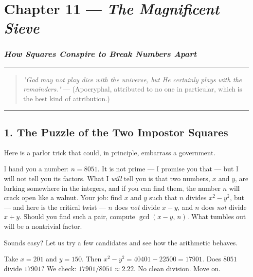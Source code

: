 \documentclass[12pt, letterpaper, openany]{book}
\theoremstyle{definition}
\theoremstyle{remark}
\begin{document}
\clearpage

\chapter{Chapter 11 --- \textit{The Magnificent Sieve}}



\subsection*{\textit{How Squares Conspire to Break Numbers Apart}}



\bigskip\noindent\rule{\textwidth}{0.4pt}\bigskip



\begin{quote}
\textit{"God may not play dice with the universe, but He certainly plays with the remainders."}
--- (Apocryphal, attributed to no one in particular, which is the best kind of attribution.)
\end{quote}



\bigskip\noindent\rule{\textwidth}{0.4pt}\bigskip



\section*{1. The Puzzle of the Two Impostor Squares}


Here is a parlor trick that could, in principle, embarrass a government.

I hand you a number: $n = 8051$. It is not prime --- I promise you that --- but I will not tell you its factors. What I \textit{will} tell you is that two numbers, $x$ and $y$, are lurking somewhere in the integers, and if you can find them, the number $n$ will crack open like a walnut. Your job: find $x$ and $y$ such that $n$ divides $x^2 - y^2$, but --- and here is the critical twist --- $n$ does \textit{not} divide $x - y$, and $n$ does \textit{not} divide $x + y$. Should you find such a pair, compute $\gcd(x - y, \, n)$. What tumbles out will be a nontrivial factor.

Sounds easy? Let us try a few candidates and see how the arithmetic behaves.

Take $x = 201$ and $y = 150$. Then $x^2 - y^2 = 40401 - 22500 = 17901$. Does $8051$ divide $17901$? We check: $17901 / 8051 \approx 2.22$. No clean division. Move on.
\end{document}
